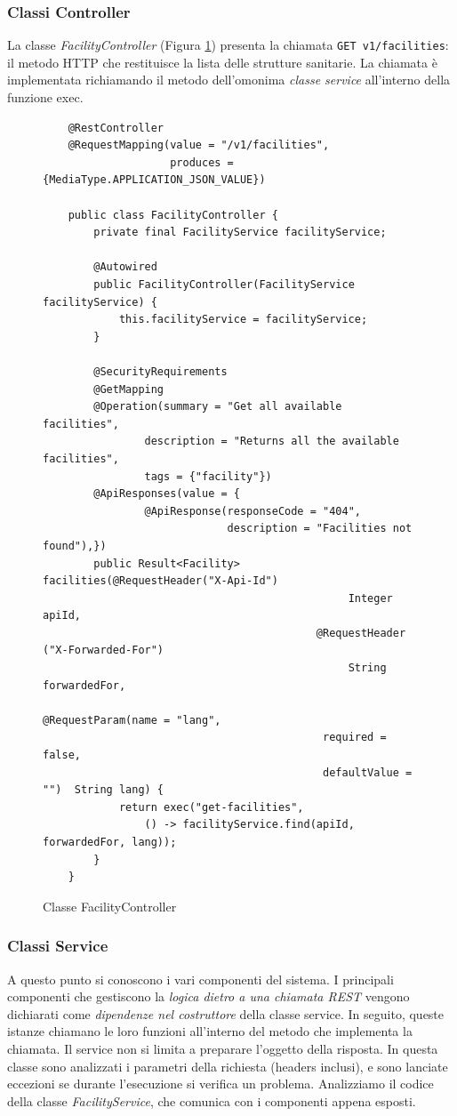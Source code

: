 \subsubsection{Classi Controller}
La classe \emph{FacilityController} (Figura \ref{fig:facilitycontroller}) presenta la chiamata \texttt{GET v1/facilities}: il metodo HTTP che restituisce la lista delle strutture sanitarie. La chiamata è implementata richiamando il metodo dell'omonima \emph{classe service} all'interno della funzione exec.
\begin{figure}
\begin{verbatim}
    @RestController
    @RequestMapping(value = "/v1/facilities",
                    produces = {MediaType.APPLICATION_JSON_VALUE})

    public class FacilityController {
        private final FacilityService facilityService;
    
        @Autowired
        public FacilityController(FacilityService facilityService) {
            this.facilityService = facilityService;
        }
    
        @SecurityRequirements
        @GetMapping
        @Operation(summary = "Get all available facilities", 
                description = "Returns all the available facilities",
                tags = {"facility"})
        @ApiResponses(value = {
                @ApiResponse(responseCode = "404", 
                             description = "Facilities not found"),})
        public Result<Facility> facilities(@RequestHeader("X-Api-Id")    
                                                Integer apiId,
                                           @RequestHeader ("X-Forwarded-For") 
                                                String forwardedFor,
                                           @RequestParam(name = "lang", 
                                            required = false, 
                                            defaultValue = "")  String lang) {
            return exec("get-facilities", 
                () -> facilityService.find(apiId, forwardedFor, lang));
        }
    }
\end{verbatim}
\caption{Classe FacilityController}
\label{fig:facilitycontroller}
\end{figure}

\subsubsection{Classi Service}
A questo punto si conoscono i vari componenti del sistema. I principali componenti che gestiscono la \emph{logica dietro a una chiamata REST} vengono dichiarati come \emph{dipendenze nel costruttore} della classe service. In seguito, queste istanze chiamano le loro funzioni all'interno del metodo che implementa la chiamata. Il service non si limita a preparare l'oggetto della risposta. In questa classe sono analizzati i parametri della richiesta (headers inclusi), e sono lanciate eccezioni se durante l'esecuzione si verifica un problema. Analizziamo il codice della classe \emph{FacilityService}, che comunica con i componenti appena esposti.

